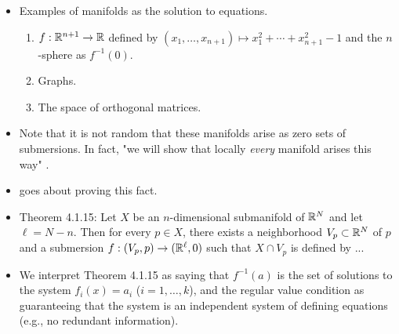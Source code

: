 \documentclass[../notes.tex]{subfiles}
\begin{document}
\begin{itemize}
    \begin{proof}
        Instead of considering $f$, let's consider $\tau_{-a}\circ f$ so that $a=0$ WLOG. Indeed, when we say "$f$" from now on, we mean "$\tau_{-a}\circ f$."\par
        To prove that $X=f^{-1}(0)$ is an $n$-manifold, it will suffice to show that for every $p\in X$, there exists a neighborhood $V\subset\R^N$ of $p$, an open subset $U\subset\R^n$, and a diffeomorphism $\phi:U\to X\cap V$. Let $p\in X$ be arbitrary. Then since 0 is a regular value of $f$, $f$ is a submersion at $p$. Thus, by the canonical submersion theorem, there exists a neighborhood $O\subset\R^N$ of 0, a neighborhood $U_0\subset U$ of $p$, and a diffeomorphism $g:O\to U_0$ such that $f\circ g=\pi$ where $\pi$ is the canonical submersion. Since $\R^N=\R^k\times\R^n$, it follows that $\pi^{-1}(0)=\{0\}\times\R^n\cong\R^n$ (where both zeros in the previous equation refer to the $0\in\R^k$). Consequently, by the definition of the diffeomorphism of vector subspaces, $g$ maps $O\cap\pi^{-1}(0)$ diffeomorphically onto $U_0\cap f^{-1}(0)$. However, $O\cap\pi^{-1}(0)\subset\R^n$ is a neighborhood of 0 and $U_0\cap f^{-1}(0)\subset X$ is a neighborhood of $p$ and these two neighborhoods are diffeomorphic.
    \end{proof}
    \item Examples of manifolds as the solution to equations.
    \begin{enumerate}
        \item $f:\mathbb{R}^{n+1}\to\mathbb{R}$ defined by $(x_1,\dots,x_{n+1})\mapsto x_1^2+\cdots+x_{n+1}^2-1$ and the $n$-sphere as $f^{-1}(0)$.
        \item Graphs.
        \item The space of orthogonal matrices.
    \end{enumerate}
    \item Note that it is not random that these manifolds arise as zero sets of submersions. In fact, "we will show that locally \emph{every} manifold arises this way" \parencite[115]{bib:DifferentialForms}.
    \item \textcite{bib:DifferentialForms} goes about proving this fact.
    \item Theorem 4.1.15: Let $X$ be an $n$-dimensional submanifold of $\mathbb{R}^N$ and let $\ell=N-n$. Then for every $p\in X$, there exists a neighborhood $V_p\subset\mathbb{R}^N$ of $p$ and a submersion $f:(V_p,p)\to(\mathbb{R}^\ell,0)$ such that $X\cap V_p$ is defined by ...
    \item We interpret Theorem 4.1.15 as saying that $f^{-1}(a)$ is the set of solutions to the system $f_i(x)=a_i$ ($i=1,\dots,k$), and the regular value condition as guaranteeing that the system is an independent system of defining equations (e.g., no redundant information).

\end{itemize}
\end{document}
